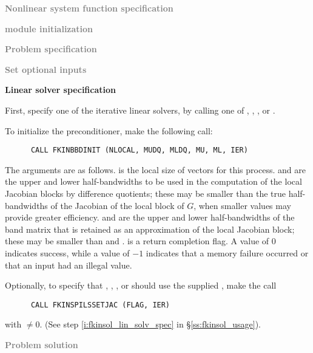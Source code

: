 \begin{Steps}
  
\item \textcolor{gray}{\bf Nonlinear system function specification}

\item \textcolor{gray}{\bf {\nvector} module initialization}

\item \textcolor{gray}{\bf Problem specification}

\item \textcolor{gray}{\bf Set optional inputs}

\item {\bf Linear solver specification}

  First, specify one of the {\kinspils} iterative linear solvers, by calling
  one of , , , or .

  To initialize the {\kinbbdpre} preconditioner, make the following call:
\begin{verbatim}
      CALL FKINBBDINIT (NLOCAL, MUDQ, MLDQ, MU, ML, IER)
\end{verbatim}
  The arguments are as follows.
   is the local size of vectors for this process.
   and  are the upper and lower half-bandwidths to be used
  in the computation of the local Jacobian blocks by difference quotients;
  these may be smaller than the true half-bandwidths of the Jacobian of the
  local block of $G$, when smaller values may provide greater efficiency.
   and  are the upper and lower half-bandwidths of the band
  matrix that is retained as an approximation of the local Jacobian block;
  these may be smaller than  and .
   is a return completion flag.  A value of $0$ indicates success, while
  a value of $-1$ indicates that a memory failure occurred or that an input had
  an illegal value.

  Optionally, to specify that {\spgmr}, {\spfgmr}, {\spbcg}, or {\sptfqmr} should use
  the supplied , make the call
\begin{verbatim}
      CALL FKINSPILSSETJAC (FLAG, IER)
\end{verbatim}
  with  $\neq 0$.
  (See step \ref{i:fkinsol_lin_solv_spec} in \S\ref{ss:fkinsol_usage}).

\item \textcolor{gray}{\bf Problem solution}


\end{Steps}
